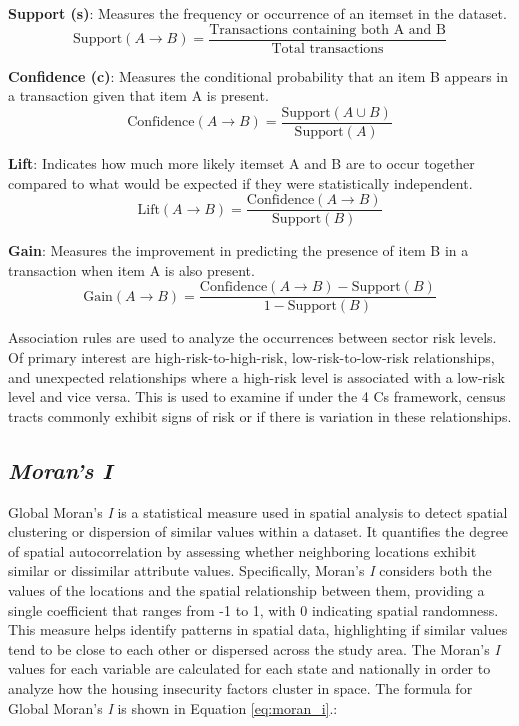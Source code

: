 \textbf{Support (s)}: Measures the frequency or occurrence of an itemset in the dataset.
\[
\text{Support}(A \rightarrow B) = \frac{\text{Transactions containing both A and B}}{\text{Total transactions}}
\]

\textbf{Confidence (c)}: Measures the conditional probability that an item B appears in a transaction given that item A is present.
\[
\text{Confidence}(A \rightarrow B) = \frac{\text{Support}(A \cup B)}{\text{Support}(A)}
\]

\textbf{Lift}: Indicates how much more likely itemset A and B are to occur together compared to what would be expected if they were statistically independent. 
\[
\text{Lift}(A \rightarrow B) = \frac{\text{Confidence}(A \rightarrow B)}{\text{Support}(B)}
\]

\textbf{Gain}: Measures the improvement in predicting the presence of item B in a transaction when item A is also present.
\[
\text{Gain}(A \rightarrow B) = \frac{\text{Confidence}(A \rightarrow B) - \text{Support}(B)}{1 - \text{Support}(B)}
\]

Association rules are used to analyze the occurrences between sector risk levels. Of primary interest are high-risk-to-high-risk, low-risk-to-low-risk relationships, and unexpected relationships where a high-risk level is associated with a low-risk level and vice versa. This is used to examine if under the 4 Cs framework, census tracts commonly exhibit signs of risk or if there is variation in these relationships.


\subsection{\textit{Moran's I}}
Global Moran's \textit{I} is a statistical measure used in spatial analysis to detect spatial clustering or dispersion of similar values within a dataset. It quantifies the degree of spatial autocorrelation by assessing whether neighboring locations exhibit similar or dissimilar attribute values. Specifically, Moran's \textit{I} considers both the values of the locations and the spatial relationship between them, providing a single coefficient that ranges from -1 to 1, with 0 indicating spatial randomness. This measure helps identify patterns in spatial data, highlighting if similar values tend to be close to each other or dispersed across the study area. The Moran's \textit{I} values for each variable are calculated for each state and nationally in order to analyze how the housing insecurity factors cluster in space. The formula for Global Moran's \textit{I} is shown in Equation \ref{eq:moran_i}.:

